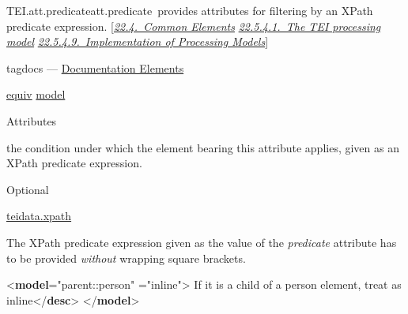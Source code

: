 \begin{reflist}
\item[]\begin{specHead}{TEI.att.predicate}{att.predicate} provides attributes for filtering by an XPath predicate expression. [\textit{\hyperref[TDcrystalsCE]{22.4.\ Common Elements}} \textit{\hyperref[TDPMPM]{22.5.4.1.\ The TEI processing model}} \textit{\hyperref[TDPMIP]{22.5.4.9.\ Implementation of Processing Models}}]\end{specHead} 
    \item[{Module}]
  tagdocs — \hyperref[TD]{Documentation Elements}
    \item[{Members}]
  \hyperref[TEI.equiv]{equiv} \hyperref[TEI.model]{model}
    \item[{Attributes}]
  Attributes\hfil\\[-10pt]\begin{sansreflist}
    \item[@predicate]
  the condition under which the element bearing this attribute applies, given as an XPath predicate expression.
\begin{reflist}
    \item[{Status}]
  Optional
    \item[{Datatype}]
  \hyperref[TEI.teidata.xpath]{teidata.xpath}
    \item[{Note}]
  \par
The XPath predicate expression given as the value of the {\itshape predicate} attribute has to be provided \textit{without} wrapping square brackets.
\end{reflist}  
\end{sansreflist}  
    \item[{Example}]
  \leavevmode\bgroup{}\exampleFont \begin{shaded}\noindent\mbox{}{<\textbf{model}\hspace*{1em}{predicate}="{parent::person}"\mbox{}\newline 
\hspace*{1em}{behaviour}="{inline}">}\mbox{}\newline 
{}If it is a child of a person element, treat as\mbox{}\newline 
\hspace*{1em}\hspace*{1em} inline{</\textbf{desc}>}\mbox{}\newline 
{</\textbf{model}>}\end{shaded}\egroup 



\end{reflist}
